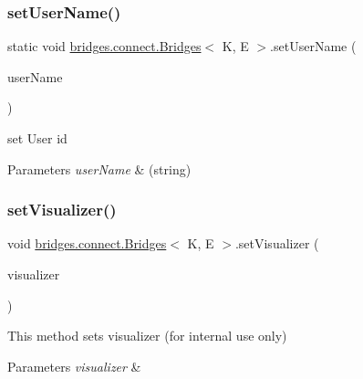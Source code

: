 \subsubsection{\texorpdfstring{set\+User\+Name()}{setUserName()}}
{\footnotesize\ttfamily static void \hyperlink{classbridges_1_1connect_1_1_bridges}{bridges.\+connect.\+Bridges}$<$ K, E $>$.set\+User\+Name (\begin{DoxyParamCaption}\item[{String}]{user\+Name }\end{DoxyParamCaption})\hspace{0.3cm}{\ttfamily [static]}}

set User id


\begin{DoxyParams}{Parameters}
{\em user\+Name} & (string) \\
\hline
\end{DoxyParams}
\hypertarget{classbridges_1_1connect_1_1_bridges_ad627f604914734646e92fac9e7b385d8}{}\label{classbridges_1_1connect_1_1_bridges_ad627f604914734646e92fac9e7b385d8} 
\subsubsection{\texorpdfstring{set\+Visualizer()}{setVisualizer()}}
{\footnotesize\ttfamily void \hyperlink{classbridges_1_1connect_1_1_bridges}{bridges.\+connect.\+Bridges}$<$ K, E $>$.set\+Visualizer (\begin{DoxyParamCaption}\item[{\hyperlink{classbridges_1_1base_1_1_a_d_t_visualizer}{A\+D\+T\+Visualizer}$<$ K, E $>$}]{visualizer }\end{DoxyParamCaption})}

This method sets visualizer (for internal use only)


\begin{DoxyParams}{Parameters}
{\em visualizer} & \\
\hline
\end{DoxyParams}
\hypertarget{classbridges_1_1connect_1_1_bridges_a6881ed6e3f3a1db1d3cda249eb8543a1}{}\label{classbridges_1_1connect_1_1_bridges_a6881ed6e3f3a1db1d3cda249eb8543a1} 
